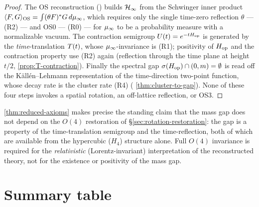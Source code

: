 \begin{proof}
The OS reconstruction () builds $\mathcal{H}_\infty$
from the Schwinger inner product
$\langle F, G\rangle_{\mathrm{OS}} = \int (\theta F)^* G \, d\mu_\infty$, which
requires only the single time-zero reflection $\theta$ --- (R2) ---
and OS0 --- (R0) --- for $\mu_\infty$ to be a probability measure with a
normalizable vacuum.  The contraction semigroup $U(t) = e^{-tH_{\mathrm{op}}}$ is
generated by the \emph{time}-translation $T(t)$, whose
$\mu_\infty$-invariance is (R1); positivity of $H_{\mathrm{op}}$ and the
contraction property use (R2) again (reflection through the time
plane at height $t/2$, 
\cref{prop:T-contraction}).  Finally the spectral gap
$\sigma(H_{\mathrm{op}}) \cap (0, m) = \emptyset$ is read off the
Källén--Lehmann representation of the time-direction two-point
function, whose decay rate is the cluster rate (R4)
( \cref{thm:cluster-to-gap}).  None of
these four steps invokes a spatial rotation, an off-lattice
reflection, or OS3.
\end{proof}

\begin{remark}
\label{rem:o4-off-critical-path}
\cref{thm:reduced-axioms} makes precise the standing claim that the
mass gap does not depend on the $O(4)$ restoration of
\S\ref{sec:rotation-restoration}: the gap is a property of the
time-translation semigroup and the time-reflection, both of which are
available from the hypercubic ($H_4$) structure alone.  Full $O(4)$
invariance is required for the \emph{relativistic} (Lorentz-invariant)
interpretation of the reconstructed theory, not for the existence or
positivity of the mass gap.
\end{remark}

\section{Summary table}
\label{sec:summary}

